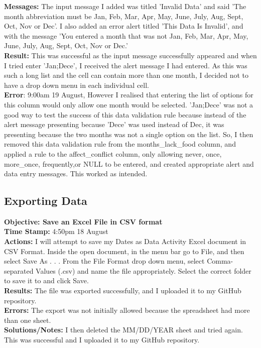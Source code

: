 \documentclass{article}
\begin{document}
\begin{FlushLeft}
\textbf{Messages:} The input message I added was titled 'Invalid Data' and said 'The month abbreviation must be Jan, Feb, Mar, Apr, May, June, July, Aug, Sept, Oct, Nov or Dec'. I also added an error alert titled 'This Data Is Invalid', and with the message 'You entered a month that was not Jan, Feb, Mar, Apr, May, June, July, Aug, Sept, Oct, Nov or Dec.'\\
\textbf{Result:} This was successful as the input message successfully appeared and when I tried enter 'Jan;Dece', I received the alert message I had entered. As this was such a long list and the cell can contain more than one month, I decided not to have a drop down menu in each individual cell.\\
\textbf{Error}: 9:00am 19 August, However I realised that entering the list of options for this column would only allow one month would be selected. 'Jan;Dece' was not a good way to test the success of this data validation rule because instead of the alert message presenting because 'Dece' was used instead of Dec, it was presenting because the two months was not a single option on the list. So, I then removed this data validation rule from the months\_lack\_food column, and applied a rule to the affect\_conflict column, only allowing never, once, more\_once, frequently,or NULL to be entered, and created appropriate alert and data entry messages. This worked as intended.\\

\subsection{Exporting Data}\label{sec:CSV}
\textbf{Objective: Save an Excel File in CSV format}\\ 
\textbf{Time Stamp:} 4:50pm 18 August\\
\textbf{Actions:} I will attempt to save my Dates as Data Activity Excel document in CSV Format. Inside the open document, in the menu bar go to File, and then select Save As . . . From the File Format drop down menu, select Comma-separated Values (.csv) and name the file appropriately. Select the correct folder to save it to and click Save. \\
\textbf{Results:} The file was exported successfully, and I uploaded it to my GitHub repository.\\
\textbf{Errors:} The export was not initially allowed because the spreadsheet had more than one sheet.\\
\textbf{Solutions/Notes:} I then deleted the MM/DD/YEAR sheet and tried again. This was successful and I uploaded it to my GitHub repository.\\


\end{FlushLeft}
\end{document}
